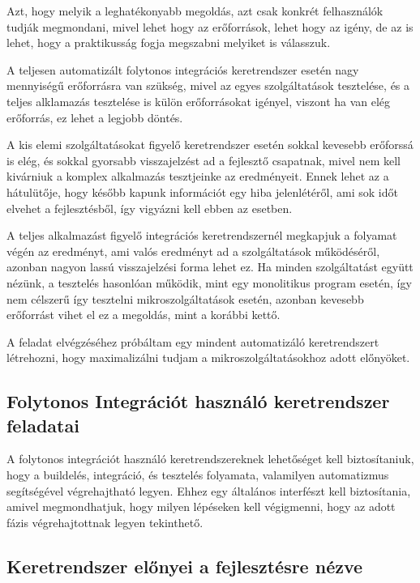 \documentclass[11pt,magyar,a4paper,twoside,]{report}
\begin{document}
Azt, hogy melyik a leghatékonyabb megoldás, azt csak konkrét
felhasználók tudják megmondani, mivel lehet hogy az erőforrások, lehet
hogy az igény, de az is lehet, hogy a praktikusság fogja megszabni
melyiket is válasszuk.

A teljesen automatizált folytonos integrációs keretrendszer esetén nagy
mennyiségű erőforrásra van szükség, mivel az egyes szolgáltatások
tesztelése, és a teljes alklamazás tesztelése is külön erőforrásokat
igényel, viszont ha van elég erőforrás, ez lehet a legjobb döntés.

A kis elemi szolgáltatásokat figyelő keretrendszer esetén sokkal
kevesebb erőforssá is elég, és sokkal gyorsabb visszajelzést ad a
fejlesztő csapatnak, mivel nem kell kivárniuk a komplex alkalmazás
tesztjeinke az eredményeit. Ennek lehet az a hátulütője, hogy később
kapunk információt egy hiba jelenlétéről, ami sok időt elvehet a
fejlesztésből, így vigyázni kell ebben az esetben.

A teljes alkalmazást figyelő integrációs keretrendszernél megkapjuk a
folyamat végén az eredményt, ami valós eredményt ad a szolgáltatások
működéséről, azonban nagyon lassú visszajelzési forma lehet ez. Ha
minden szolgáltatást együtt nézünk, a tesztelés hasonlóan működik, mint
egy monolitikus program esetén, így nem célszerű így tesztelni
mikroszolgáltatások esetén, azonban kevesebb erőforrást vihet el ez a
megoldás, mint a korábbi kettő.

A feladat elvégzéséhez próbáltam egy mindent automatizáló keretrendszert
létrehozni, hogy maximalizálni tudjam a mikroszolgáltatásokhoz adott
előnyöket.

\subsection{Folytonos Integrációt használó keretrendszer
feladatai}\label{folytonos-integruxe1ciuxf3t-hasznuxe1luxf3-keretrendszer-feladatai}

A folytonos integrációt használó keretrendszereknek lehetőséget kell
biztosítaniuk, hogy a buildelés, integráció, és tesztelés folyamata,
valamilyen automatizmus segítségével végrehajtható legyen. Ehhez egy
általános interfészt kell biztosítania, amivel megmondhatjuk, hogy
milyen lépéseken kell végigmenni, hogy az adott fázis végrehajtottnak
legyen tekinthető.

\subsection{Keretrendszer előnyei a fejlesztésre
nézve}\label{keretrendszer-elux151nyei-a-fejlesztuxe9sre-nuxe9zve}
\end{document}
